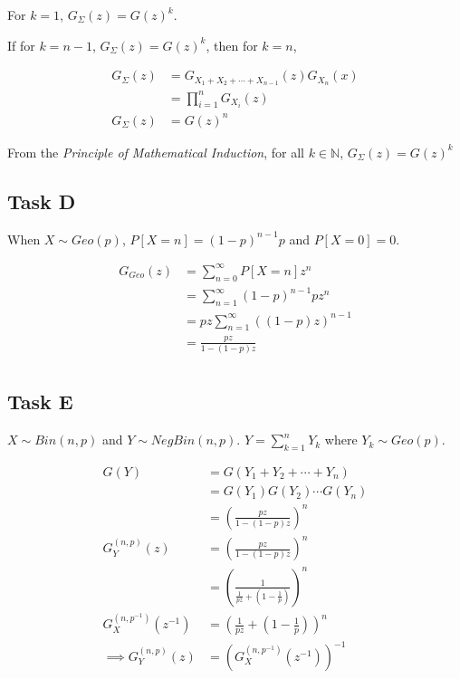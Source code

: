For $k = 1$, $G_\Sigma(z) = G(z)^k$.

If for $k = n-1$, $G_\Sigma(z) = G(z)^k$, then for $k = n$, 

\begin{align*}
    G_\Sigma(z) &= G_{X_1 + X_2 + \cdots + X_{n-1}}(z)G_{X_n}(x) \\ 
    &= \prod_{i=1}^{n} G_{X_i}(z) \\
    G_\Sigma(z) &= G(z)^n
\end{align*}

From the \textit{Principle of Mathematical Induction}, for all $k \in \mathbb{N}$, $G_\Sigma(z) = G(z)^k$

\subsection{Task D}

When $X \sim Geo(p)$, $P[X = n] = (1-p)^{n-1}p$ and $P[X = 0] = 0$.

\begin{align*}
    G_{Geo}(z) &= \sum_{n=0}^{\infty} P[X = n]z^n \\
    &= \sum_{n=1}^{\infty} (1-p)^{n-1}pz^n \\
    &= pz \sum_{n=1}^{\infty} ((1-p)z)^{n-1} \\
    &= \frac{pz}{1-(1-p)z} \\
\end{align*}

\subsection{Task E}

$X \sim Bin(n, p)$ and $Y \sim NegBin(n, p)$. $Y = \sum_{k=1}^n Y_k$ where $Y_k \sim Geo(p)$.

\begin{align*}
    G(Y) &= G(Y_1 + Y_2 + \cdots + Y_n) \\
    &= G(Y_1)G(Y_2)\cdots G(Y_n) \\
    &= \left(\frac{pz}{1-(1-p)z}\right)^n \\
    G_Y^{(n, p)}(z) &= \left(\frac{pz}{1-(1-p)z}\right)^n \\
    &= \left(\frac{1}{\frac{1}{pz}+(1-\frac{1}{p})}\right)^n \\
    G_X^{(n, p^{-1})}(z^{-1}) &= \left(\frac{1}{pz}+(1-\frac{1}{p})\right)^n \\
    \implies G_Y^{(n, p)}(z) &= \left(G_X^{(n, p^{-1})}(z^{-1})\right)^{-1}
\end{align*}

